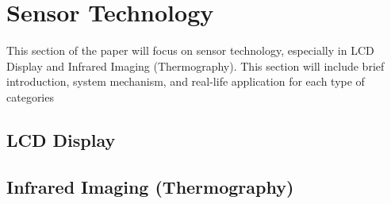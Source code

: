 \newpage
\justifying
\noindent

\section{Sensor Technology}
This section of the paper will focus on sensor technology, especially in LCD Display and Infrared Imaging (Thermography). This section will include brief introduction, system mechanism, and real-life application for each type of categories

\subsection{LCD Display}
\subsection{Infrared Imaging (Thermography)}